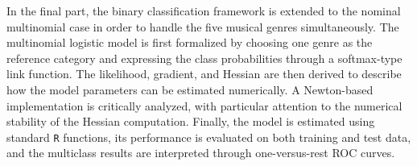 In the final part, the binary classification framework is extended to the nominal multinomial case in order to handle the five musical genres simultaneously. The multinomial logistic model is first formalized by choosing one genre as the reference category and expressing the class probabilities through a softmax-type link function. The likelihood, gradient, and Hessian are then derived to describe how the model parameters can be estimated numerically. A Newton-based implementation is critically analyzed, with particular attention to the numerical stability of the Hessian computation. Finally, the model is estimated using standard \texttt{R} functions, its performance is evaluated on both training and test data, and the multiclass results are interpreted through one-versus-rest ROC curves.